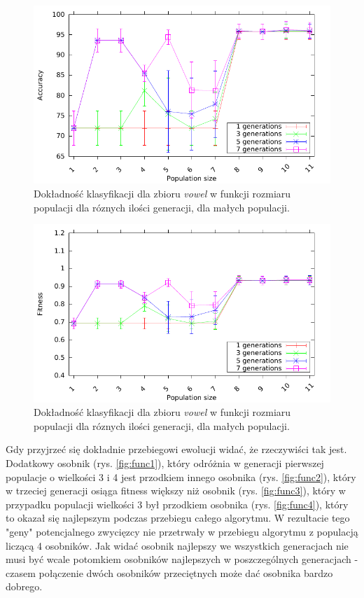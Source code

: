 	\begin{figure}
		\includegraphics[scale=0.90]{figures/results/accuracy/accuracy-vowel-detailed}
		\caption{Dokładność klasyfikacji dla zbioru \emph{vowel} w funkcji rozmiaru populacji dla róznych ilości generacji, dla małych populacji.\label{fig:acc-vowel-detailed}}
	\end{figure}
		
	\begin{figure}
		\includegraphics[scale=0.90]{figures/results/fitness/fitness-vowel-detailed}
		\caption{Dokładność klasyfikacji dla zbioru \emph{vowel} w funkcji rozmiaru populacji dla róznych ilości generacji, dla małych populacji.\label{fig:fit-vowel-detailed}}
	\end{figure}

    	
	\FloatBarrier
	 Gdy przyjrzeć się dokładnie przebiegowi ewolucji widać, że rzeczywiści tak jest. Dodatkowy osobnik (rys. \ref{fig:func1}), który odróżnia w generacji pierwszej populacje o wielkości 3 i 4 jest przodkiem innego osobnika (rys. \ref{fig:func2}), który w trzeciej generacji osiąga fitness większy niż osobnik (rys. \ref{fig:func3}), który w przypadku populacji wielkości 3 był przodkiem osobnika (rys. \ref{fig:func4}), który to okazał się najlepszym podczas przebiegu całego algorytmu. W rezultacie tego "geny" potencjalnego zwycięzcy nie przetrwały w przebiegu algorytmu z populacją liczącą 4 osobników. Jak widać osobnik najlepszy we wszystkich generacjach nie musi być wcale potomkiem osobników najlepszych w poszczególnych generacjach - czasem połączenie dwóch osobników przeciętnych może dać osobnika bardzo dobrego. 	
	 
